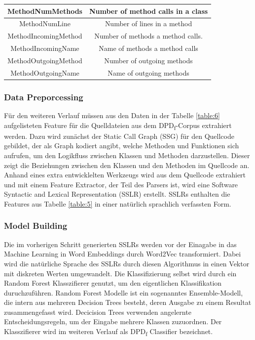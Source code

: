 \documentclass[conference]{IEEEtran}
\begin{document}
\begin{table}
\begin{tabular}{|c|c|}
        \hline
        MethodNumMethods     & Number of method calls in a class                                                    \\
        \hline
        MethodNumLine        & Number of lines in a method                                                          \\
        \hline
        MethodIncomingMethod & Number of methods a method calls.                                                    \\
        \hline
        MethodIncomingName   & Name of methods a method calls                                                       \\
        \hline
        MethodOutgoingMethod & Number of outgoing methods                                                           \\
        \hline
        MethodOutgoingName   & Name of outgoing methods                                                             \\
        \hline
    \end{tabular}
\end{table}

\newpage

\subsubsection*{Data Preporcessing}

Für den weiteren Verlauf müssen aus den Daten in der Tabelle \ref{table:6} aufgelisteten Feature für die Quelldateien aus dem DPD\textsubscript{f}-Corpus extrahiert werden.
Dazu wird zunächst der Static Call Graph (SSG) für den Quellcode gebildet, der als Graph kodiert angibt, welche Methoden und Funktionen sich aufrufen, um den Logikfluss zwischen Klassen und Methoden darzustellen.
Dieser zeigt die Beziehungen zwischen den Klassen und den Methoden im Quellcode an. Anhand eines extra entwicklelten Werkzeugs wird aus dem Quellcode extrahiert und mit einem Feature Extractor, der Teil des Parsers ist, wird eine Software Syntactic and Lexical Representation (SSLR) erstellt.
SSLRs enthalten die Features aus Tabelle \ref{table:5} in einer natürlich sprachlich verfassten Form.

\subsubsection*{Model Building}

Die im vorherigen Schritt generierten SSLRs werden vor der Einagabe in das Machine Learning in Word Embeddings durch Word2Vec transformiert. Dabei wird die natürliche Sprache des SSLRs durch diesen Algorithmus in einen Vektor mit diskreten Werten umgewandelt.
Die Klassifizierung selbst wird durch ein Random Forest Klasszifierer genutzt, um den eigentlichen Klassifikation duruchzuführen. Random Forest Modelle ist ein sogenanntes Ensemble-Modell, die intern aus mehreren Decision Trees besteht, deren Ausgabe zu einem Resultat zusammengefasst wird. Decicision Trees verwenden angelernte Entscheidungsregeln, um der Eingabe mehrere Klassen zuzuordnen.
Der Klasszifierer wird im weiteren Verlauf als DPD\textsubscript{f} Classifier bezeichnet.
\end{document}
